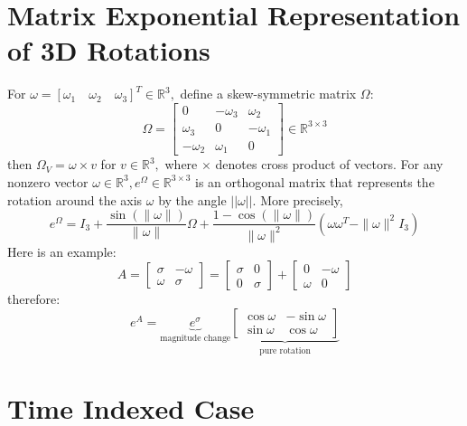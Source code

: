 \documentclass[10pt,a4paper,oneside]{article}
\begin{document}
\section{Matrix Exponential Representation of 3D Rotations}
For $\omega=\left[\omega_{1} \quad \omega_{2} \quad \omega_{3}\right]^{T} \in \mathbb{R}^{3},$ define a skew-symmetric matrix $\Omega$:
\[
\Omega=\left[\begin{array}{ccc}{0} & {-\omega_{3}} & {\omega_{2}} \\ {\omega_{3}} & {0} & {-\omega_{1}} \\ {-\omega_{2}} & {\omega_{1}} & {0}\end{array}\right] \in \mathbb{R}^{3 \times 3}
\]
then $\Omega_V=\omega \times v$ for $v \in \mathbb{R}^{3},$ where $\times$ denotes cross product of vectors. For any nonzero vector $\omega \in \mathbb{R}^{3}, e^{\Omega} \in \mathbb{R}^{3 \times 3}$ is an orthogonal matrix that represents the rotation around the axis $\omega$ by the angle $||\omega||$.  More precisely,
\[
e^{\Omega}=I_{3}+\frac{\sin (\|\omega\|)}{\|\omega\|} \Omega+\frac{1-\cos (\|\omega\|)}{\|\omega\|^{2}}\left(\omega \omega^{T}-\|\omega\|^{2} I_{3}\right)
\]
Here is an example: 
\[
A= \left[\begin{array}{cc}{\sigma} & {-\omega} \\ {\omega} & {\sigma}\end{array}\right] = \left[\begin{array}{cc}{\sigma} & {0} \\ {0} & {\sigma}\end{array}\right] + \left[\begin{array}{cc}{0} & {-\omega} \\ {\omega} & {0}\end{array}\right]
\]
therefore:
\[
e^A = \underbrace{e^\sigma}_{\text{magnitude change}} \underbrace{ \left[\begin{array}{cc}{\cos \omega} & {-\sin \omega} \\ {\sin \omega} & {\cos \omega}\end{array}\right]}_{\text{pure rotation}}
\]

\section{Time Indexed Case}
\end{document}
